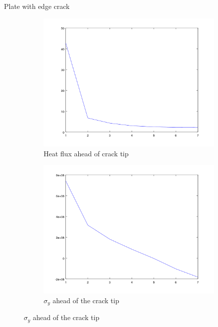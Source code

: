 \documentclass{beamer}
\begin{document}
\begin{frame}[t,fragile]{Plate with edge crack}
\begin{figure}
\begin{subfigure}{.3\textwidth}
\end{subfigure}
\hspace{1pt}
    \begin{subfigure}{.3\textwidth}
    \centering
    \includegraphics[scale=.2]{onlytempqy}
    \caption{\tiny Heat flux ahead of crack tip}
    \label{fig:heat}
\end{subfigure}
\hspace{1pt}
    \begin{subfigure}{.3\textwidth}
        \includegraphics[scale=.2]{only_bothstress}
        \caption{\tiny $\sigma_y$ ahead of the crack tip}
    \label{heat1}
\end{subfigure}
\end{figure}
\end{frame}
\end{document}
